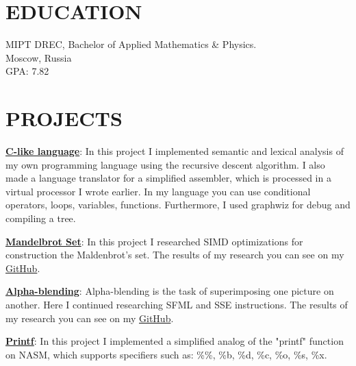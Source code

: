 \documentclass[margin]{res}
\begin{document}
\begin{resume}

\section{EDUCATION}
MIPT DREC, Bachelor of Applied Mathematics \& Physics. \\
Moscow, Russia\\
GPA: 7.82

\section{PROJECTS}
\par
\textbf{\href{https://github.com/KirillLakhnov/Language}{C-like language}}: 
In this project I implemented semantic and lexical analysis of my own programming language using the recursive descent algorithm. I also made a language translator for a simplified assembler, which is processed in a virtual processor I wrote earlier. In my language you can use conditional operators, loops, variables, functions. Furthermore, I used graphwiz for debug and compiling a tree.

\par
\textbf{\href{https://github.com/KirillLakhnov/Mandelbrot}{Mandelbrot Set}}:
In this project I researched SIMD optimizations for construction the Maldenbrot's set. The results of my research you can see on my \href{https://github.com/KirillLakhnov/Mandelbrot}{GitHub}.

\par
\textbf{\href{https://github.com/KirillLakhnov/Alpha-blending}{Alpha-blending}}: 
Alpha-blending is the task of superimposing one picture on another. Here I continued researching SFML and SSE instructions. The results of my research you can see on my \href{https://github.com/KirillLakhnov/Alpha-blending}{GitHub}.

\par
\textbf{\href{https://github.com/KirillLakhnov/ASM_PRINTF}{Printf}}: 
In this project I implemented a simplified analog of the "printf" function on NASM, which supports specifiers such as: \%\%, \%b, \%d, \%c, \%o, \%s, \%x.



\end{resume}
\end{document}
